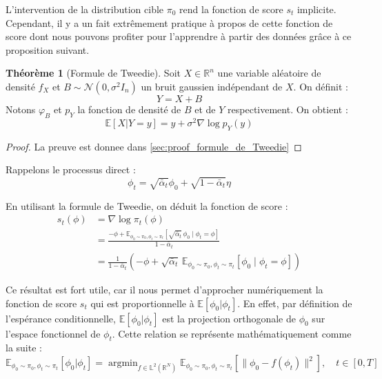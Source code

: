 \documentclass[a4paper,10pt]{article}
\theoremstyle{definition} %
\theoremstyle{definition} %
\theoremstyle{definition} %
\newtheorem{theorem}[definition]{Théorème}
\theoremstyle{definition} %
\newcommand{\argmin}{\mathop{\mathrm{argmin}}}
\begin{document}
L'intervention de la distribution cible $\pi_0$ rend la fonction de score $s_t$ implicite. Cependant, il y a un fait extrêmement pratique à propos de cette fonction de score dont nous pouvons profiter pour l'apprendre à partir des données grâce à ce proposition suivant.

\begin{theorem}[Formule de Tweedie]\label{theo:formule_de_Tweedie}
Soit $X \in \mathbb{R}^n$ une variable aléatoire de densité $f_X$ et $B \sim \mathcal{N}(0, \sigma^2 I_n)$ un bruit gaussien indépendant de $X$. On définit :
\[ Y = X + B \]
Notons $\varphi_B$ et $p_Y$ la fonction de densité de $B$ et de $Y$ respectivement. On obtient :
\[ \mathbb{E}[X | Y = y] = y + \sigma^2 \nabla \log p_Y(y) \]
\end{theorem}

\begin{proof}
    La preuve est donnee dans \cref{sec:proof_formule_de_Tweedie}
\end{proof}

Rappelons le processus direct :
\[ \phi_t = \sqrt{\bar \alpha_t} \phi_0 + \sqrt{1 - \bar \alpha_t} \eta \]

En utilisant la formule de Tweedie, on déduit la fonction de score :
\begin{align*}
s_t(\phi) &= \nabla \log \pi_t(\phi) \\
&= \frac{-\phi + \mathbb{E}_{\phi_0 \sim \pi_0, \phi_t \sim \pi_t} \left[\sqrt{\bar \alpha_t}\, \phi_0 \mid \phi_t = \phi \right]}{1 - \bar \alpha_t} \\
&= \frac{1}{1 - \bar \alpha_t} \left( -\phi + \sqrt{\bar \alpha_t} \,\mathbb{E}_{\phi_0 \sim \pi_0, \phi_t \sim \pi_t} \left[ \phi_0 \mid \phi_t = \phi \right] \right)
\end{align*}


Ce résultat est fort utile, car il nous permet d'approcher numériquement la fonction de score $s_t$ qui est proportionnelle à $\mathbb{E}[\phi_0 | \phi_t]$. En effet, par définition de l'espérance conditionnelle, $\mathbb{E}[\phi_0 | \phi_t]$ est la projection orthogonale de $\phi_0$ sur l'espace fonctionnel de $\phi_t$. Cette relation se représente mathématiquement comme la suite :
\[
\mathbb{E}_{\phi_0 \sim \pi_0, \phi_t \sim \pi_t}[\phi_0 | \phi_t] = \argmin_{f \in \mathbb{L}^2(\mathbb{R}^N)} \mathbb{E}_{\phi_0 \sim \pi_0, \phi_t \sim \pi_t}\left[ \| \phi_0 - f(\phi_t) \|^2 \right], \quad t \in [0,T]
\]

\end{document}
